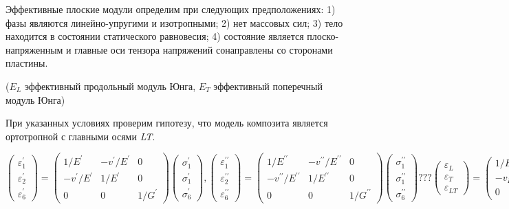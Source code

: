 Эффективные плоские модули определим при следующих предположениях: 1) фазы являются линейно-упругими и изотропными; 2) нет массовых сил; 3) тело находится в состоянии статического равновесия; 4) состояние является плоско-напряженным и главные оси тензора напряжений сонаправлены со сторонами пластины.


($E_L$ эффективный продольный модуль Юнга, $E_T$ эффективный поперечный модуль Юнга)

При указанных условиях проверим гипотезу, что модель композита является ортотропной с главными осями \textit{LT}.

$
\displaystyle
\left(\begin{array}{l}
\varepsilon_1^{\prime} \\
\varepsilon_2^{\prime} \\
\varepsilon_6^{\prime}
\end{array}\right)=\left(\begin{array}{ccc}
1 / E^{\prime} & -v^{\prime} / E^{\prime} & 0 \\
-v^{\prime} / E^{\prime} & 1 / E^{\prime} & 0 \\
0 & 0 & 1 / G^{\prime}
\end{array}\right)\left(\begin{array}{l}
\sigma_1^{\prime} \\
\sigma_1^{\prime} \\
\sigma_6^{\prime}
\end{array}\right),
\left(\begin{array}{l}
\varepsilon_1^{\prime \prime} \\
\varepsilon_2^{\prime \prime} \\
\varepsilon_6^{\prime \prime}
\end{array}\right)=\left(\begin{array}{ccc}
1 / E^{\prime \prime} & -v^{\prime \prime} / E^{\prime \prime} & 0 \\
-v^{\prime \prime} / E^{\prime \prime} & 1 / E^{\prime \prime} & 0 \\
0 & 0 & 1 / G^{\prime \prime}
\end{array}\right)\left(\begin{array}{l}
\sigma_1^{\prime \prime} \\
\sigma_1^{\prime \prime} \\
\sigma_6^{\prime \prime}
\end{array}\right)
\textbf{???} 
\left(\begin{array}{l}
\varepsilon_L \\
\varepsilon_T \\
\varepsilon_{L T}
\end{array}\right)=\left(\begin{array}{ccc}
1 / E_L & -v_{T L} / E_T & 0 \\
-v_{L T} / E_L & 1 / E_T & 0 \\
0 & 0 & 1 / G_{L T}
\end{array}\right)\left(\begin{array}{l}
\sigma_L \\
\sigma_T \\
\sigma_{L T}
\end{array}\right) \textbf{???}$


